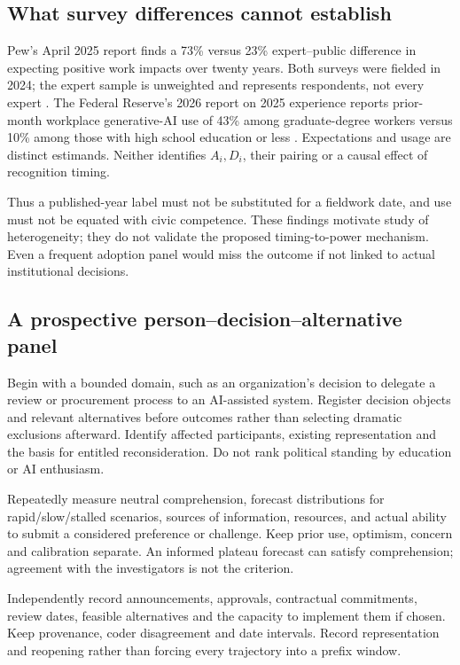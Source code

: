 \documentclass[11pt,a4paper]{article}
\theoremstyle{definition}\newtheorem{definition}{Definition}
\begin{document}
\subsection{What survey differences cannot establish}
Pew's April 2025 report finds a 73\% versus 23\% expert--public difference in expecting positive work impacts over twenty years. Both surveys were fielded in 2024; the expert sample is unweighted and represents respondents, not every expert \cite{pew}. The Federal Reserve's 2026 report on 2025 experience reports prior-month workplace generative-AI use of 43\% among graduate-degree workers versus 10\% among those with high school education or less \cite{fed}. Expectations and usage are distinct estimands. Neither identifies $A_i,D_i$, their pairing or a causal effect of recognition timing.

Thus a published-year label must not be substituted for a fieldwork date, and use must not be equated with civic competence. These findings motivate study of heterogeneity; they do not validate the proposed timing-to-power mechanism. Even a frequent adoption panel would miss the outcome if not linked to actual institutional decisions.

\subsection{A prospective person--decision--alternative panel}
Begin with a bounded domain, such as an organization's decision to delegate a review or procurement process to an AI-assisted system. Register decision objects and relevant alternatives before outcomes rather than selecting dramatic exclusions afterward. Identify affected participants, existing representation and the basis for entitled reconsideration. Do not rank political standing by education or AI enthusiasm.

Repeatedly measure neutral comprehension, forecast distributions for rapid/slow/stalled scenarios, sources of information, resources, and actual ability to submit a considered preference or challenge. Keep prior use, optimism, concern and calibration separate. An informed plateau forecast can satisfy comprehension; agreement with the investigators is not the criterion.

Independently record announcements, approvals, contractual commitments, review dates, feasible alternatives and the capacity to implement them if chosen. Keep provenance, coder disagreement and date intervals. Record representation and reopening rather than forcing every trajectory into a prefix window.
\end{document}
